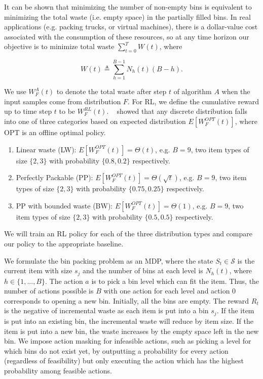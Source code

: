 \documentclass[letterpaper]{article} %
\newcommand{\citet}[1]{\citeauthor{#1}~\shortcite{#1}}
\begin{document}
It can be shown that minimizing the number of non-empty bins is equivalent to minimizing the total waste (i.e. empty space) in the partially filled bins. In real applications (e.g. packing trucks, or virtual machines), there is a dollar-value cost associated with the consumption of these resources, so at any time horizon our objective is to minimize total waste $\sum_{t=0}^{T} W(t)$, where

\begin{equation}
\label{waste}
W(t) \triangleq \sum_{h=1}^{B-1} N_h(t)(B-h). 
\end{equation}

\noindent We use $W^{A}_{F}(t)$ to denote the total waste after step $t$ of algorithm $A$ when the input samples come from distribution $F$. For RL, we define the cumulative reward up to time step $t$ to be $W^{RL}_{F}(t)$. \citet{courcobetis1990stability} showed that any discrete distribution falls into one of three categories based on expected distribution $E[W^{OPT}_{F}(t)]$, where OPT is an offline optimal policy.
\begin{enumerate}[topsep=0pt,itemsep=-1ex,partopsep=1ex,parsep=1ex]
	\item Linear waste (LW): $E[W^{OPT}_{F}(t)] = \Theta(t)$, e.g. $B = 9$, two item types of size $\{2,3\}$ with probability $\{0.8, 0.2\}$ respectively.
	\item Perfectly Packable (PP):  $E[W^{OPT}_{F}(t)] = \Theta(\sqrt{t})$, e.g.  $B = 9$, two item types of size $\{2,3\}$ with probability $\{0.75, 0.25\}$ respectively.
	\item PP with bounded waste (BW): $E[W^{OPT}_{F}(t)] = \Theta(1)$, e.g. $B = 9$, two item types of size $\{2,3\}$ with probability $\{0.5, 0.5\}$ respectively.
\end{enumerate}
We will train an RL policy for each of the three distribution types and compare our policy to the appropriate baseline.

We formulate the bin packing problem as an MDP, where the state $S_t \in \mathcal{S}$ is the current item with size $s_j$ and the number of bins at each level is $N_h(t)$, where $h \in \{1,...,B\}$. The action $a$ is to pick a bin level which can fit the item.  Thus, the number of actions possible is $B$ with one action for each level and action 0 corresponds to opening a new bin. Initially, all the bins are empty. The reward $R_t$ is the negative of incremental waste as each item is put into a bin $s_j$. If the item is put into an existing bin, the incremental waste will reduce by item size. If the item is put into a new bin, the waste increases by the empty space left in the new bin. We impose action masking for infeasible actions, such as picking a level for which bins do not exist yet, by outputting a probability for every action (regardless of feasibility) but only executing the action which has the highest probability among feasible actions.
\end{document}
